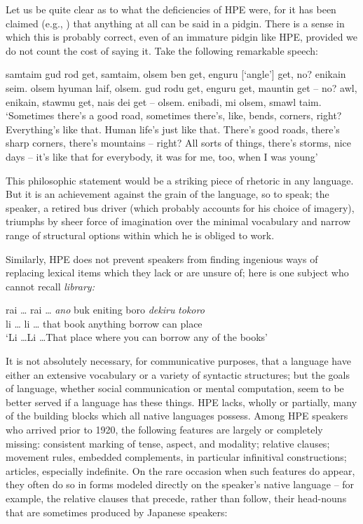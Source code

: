 Let us be quite clear as to what the deficiencies of HPE were, for it has been claimed (e.g., \citealt{Samarin1971}) that anything at all can be said in a pidgin. There is a sense in which this is probably correct, even of an immature pidgin like HPE, provided we do not count the cost of saying it. Take the following remarkable speech:

\ea\label{ex:12}
 samtaim gud rod get, samtaim, olsem ben get, enguru [`angle'] get, no? enikain seim. olsem hyuman laif, olsem. gud rodu get, enguru get, mauntin get -- no? awl, enikain, stawmu get, nais dei get -- olsem. enibadi, mi olsem, smawl taim.
\glt  `Sometimes there's a good road, sometimes there's, like, bends, corners, right? Everything's like that. Human life's just like that. There's good roads, there's sharp corners, there's mountains -- right? All sorts of things, there's storms, nice days -- it's like that for everybody, it was for me, too, when I was young'
\z

\noindent This philosophic statement would be a striking piece of rhetoric in any language. But it is an achievement against the grain of the language, so to speak; the speaker, a retired bus driver (which probably accounts for his choice of imagery), triumphs by sheer force of imagination over
the minimal vocabulary and narrow range of structural options within which he is obliged to work.

Similarly, HPE does not prevent speakers from finding ingenious ways of replacing lexical items which they lack or are unsure of; here is one subject who cannot recall \textit{library:}


\ea\label{ex:13}
\gll rai \ldots {} rai \ldots {} \emph{ano} buk eniting boro \emph{dekiru} \emph{tokoro}\\
li \ldots {} li \ldots {} that book anything borrow can place\\
\glt `Li \ldots  Li \ldots  That place where you can borrow any of the books'
\z

It is not absolutely necessary, for communicative purposes, that a language have either an extensive vocabulary or a variety of syntactic structures; but the goals of language, whether social communication or mental computation, seem to be better served if a language has these things. HPE lacks, wholly or partially, many of the building blocks which all native languages possess. Among HPE speakers who arrived prior to 1920, the following features are largely or completely missing: consistent marking of tense, aspect, and modality; relative clauses; movement rules, embedded complements, in particular infinitival con\-structions; articles, especially indefinite. On the rare occasion when such features do appear, they often do so in forms modeled directly on the speaker's native language -- for example, the relative clauses that precede, rather than follow, their head-nouns that are sometimes produced by Japanese speakers:

